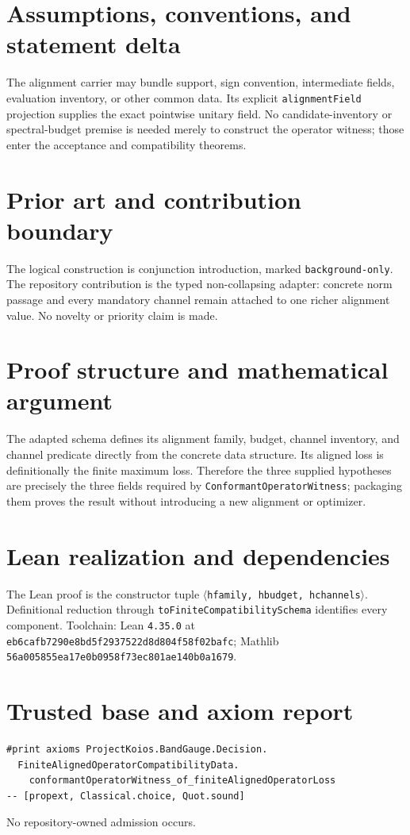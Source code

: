 \documentclass[11pt]{article}
\begin{document}
\section{Assumptions, conventions, and statement delta}
The alignment carrier may bundle support, sign convention, intermediate fields, evaluation inventory, or other common data.  Its explicit \texttt{alignmentField} projection supplies the exact pointwise unitary field.  No candidate-inventory or spectral-budget premise is needed merely to construct the operator witness; those enter the acceptance and compatibility theorems.

\section{Prior art and contribution boundary}
The logical construction is conjunction introduction, marked \texttt{background-only}.  The repository contribution is the typed non-collapsing adapter: concrete norm passage and every mandatory channel remain attached to one richer alignment value.  No novelty or priority claim is made.

\section{Proof structure and mathematical argument}
The adapted schema defines its alignment family, budget, channel inventory, and channel predicate directly from the concrete data structure.  Its aligned loss is definitionally the finite maximum loss.  Therefore the three supplied hypotheses are precisely the three fields required by \texttt{ConformantOperatorWitness}; packaging them proves the result without introducing a new alignment or optimizer.

\section{Lean realization and dependencies}
The Lean proof is the constructor tuple \texttt{$\langle$hfamily, hbudget, hchannels$\rangle$}.  Definitional reduction through \texttt{toFiniteCompatibilitySchema} identifies every component.  Toolchain: Lean \texttt{4.35.0} at \texttt{eb6cafb7290e8bd5f2937522d8d804f58f02bafc}; Mathlib \texttt{56a005855ea17e0b0958f73ec801ae140b0a1679}.

\section{Trusted base and axiom report}
\begin{verbatim}
#print axioms ProjectKoios.BandGauge.Decision.
  FiniteAlignedOperatorCompatibilityData.
    conformantOperatorWitness_of_finiteAlignedOperatorLoss
-- [propext, Classical.choice, Quot.sound]
\end{verbatim}
No repository-owned admission occurs.
\end{document}
